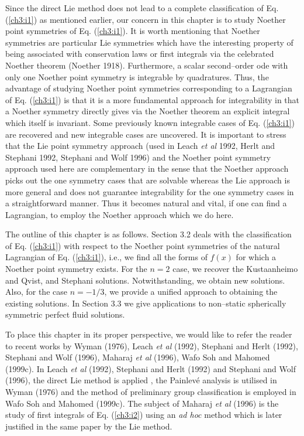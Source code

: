 Since the direct Lie method does not lead to a
complete classification of Eq. (\ref{ch3:i1}) as mentioned earlier, our
concern in this chapter is to study Noether point symmetries of Eq. (\ref{ch3:i1}). It
is worth mentioning that Noether symmetries  are particular Lie symmetries
which have the interesting property of being associated with conservation
laws or first integrals via  the celebrated Noether theorem
(Noether 1918). Furthermore, a scalar
second--order ode  with only one Noether point symmetry is integrable by
quadratures. Thus, the advantage of studying Noether point symmetries 
corresponding to a Lagrangian of Eq. (\ref{ch3:i1}) is that it is a more
fundamental approach for integrability in that a Noether symmetry directly gives 
via the Noether theorem an explicit integral which itself is invariant. Some previously known
integrable cases of Eq. (\ref{ch3:i1}) are recovered and new integrable cases are uncovered. It is important
to stress that the Lie point symmetry approach
(used in Leach {\em et al } 1992, Herlt and Stephani 1992,
Stephani and Wolf 1996)
and the Noether point symmetry approach used here are complementary
in the sense that the Noether approach picks 
out the one symmetry cases that are solvable whereas the Lie approach is more general
and does not guarantee integrability for the one symmetry cases in a straightforward
manner. Thus it becomes natural and vital, if one can
find a Lagrangian, to employ the Noether approach which we do here. 

 
The outline of this chapter is as follows. Section 3.2 deals with the
classification of Eq. (\ref{ch3:i1}) with respect to the Noether point symmetries of the natural
Lagrangian of Eq. (\ref{ch3:i1}),
i.e., we find all the forms of $f(x)$ for which a Noether point symmetry
exists. For the $n=2$ case, we recover the Kustaanheimo and Qvist, and Stephani solutions.
Notwithstanding, we obtain new solutions. Also, for the case $n=-1/3$, we provide a unified
approach to obtaining the existing solutions. In Section 3.3 we give
applications to non--static spherically symmetric perfect fluid solutions.

To place this chapter in its proper perspective, we would like
to refer the reader to  recent works by
Wyman (1976), Leach {\em et al} (1992), Stephani and Herlt (1992),
Stephani and Wolf (1996), Maharaj {\em et al} (1996),
Wafo Soh and Mahomed (1999c).
In  Leach {\em et al} (1992), Stephani and Herlt (1992) and
Stephani and Wolf (1996),
the direct Lie method is applied , the Painlev\'e analysis is
utilised in  Wyman (1976) and the method of preliminary group classification
is employed in Wafo Soh and Mahomed (1999c). The subject of
Maharaj {\em et al} (1996) is the study of first integrals of
Eq. (\ref{ch3:i2}) using an {\em ad hoc} method which is later justified
in the same paper by the Lie method.


